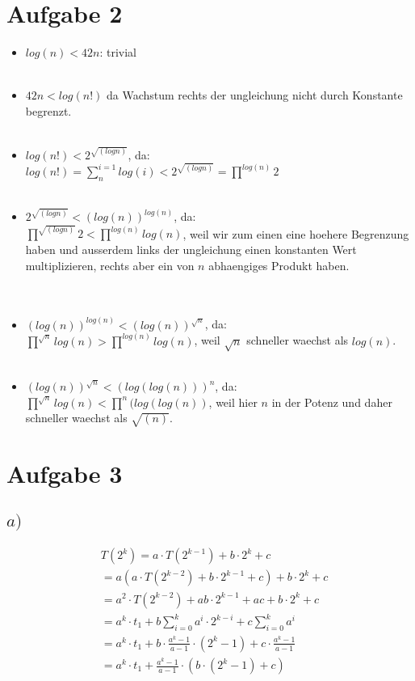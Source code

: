 \documentclass[a4paper]{scrartcl}
\begin{document}
\section*{Aufgabe 2}
\begin{itemize}
	
	\item $log(n) < 42n$: trivial\\
	\\
	\item $42n < log(n!)$ da Wachstum rechts der ungleichung nicht durch Konstante begrenzt.
	\\\\
	\item $log(n!) < 2^{\sqrt{(log n)}}$, da:\\
	$log(n!) = \sum_{n}^{i=1}log(i) <  2^{\sqrt{(log n)}} = \prod^{log(n)} 2$
	\\\\
	\item $2^{\sqrt{(log n)}} < (log(n))^{log(n)}$, da:\\
	$\prod^{\sqrt{(log n)}}2 < \prod^{log(n)}log(n)$, weil wir zum einen eine hoehere Begrenzung haben und ausserdem links der ungleichung einen konstanten Wert multiplizieren, rechts aber ein von $n$ abhaengiges Produkt haben.\\
	\\\\
	\item $(log(n))^{log(n)} < (log(n))^{\sqrt{n}}$, da:\\
	$\prod^{\sqrt{n}} log(n) >  \prod^{log(n)} log(n)$, weil $\sqrt{n}$ schneller waechst als $log(n)$.\\
	\\
	\item $(log(n))^{\sqrt{n}} < (log(log(n)))^n$, da:\\
	$\prod^{\sqrt{n}} log(n) <  \prod^{n} (log(log(n))$, weil hier $n$ in der Potenz und daher schneller waechst als $\sqrt{(n)}$.\
\end{itemize} 


\section*{Aufgabe 3}
\subsection*{$a)$}
\begin{align}
	&T(2^k) = a \cdot T(2^{k-1}) + b \cdot 2^k +c\\
	&= a (a \cdot T(2^{k-2}) + b \cdot 2^{k-1} + c) + b\cdot 2^k +c\\
	&=a^2 \cdot T(2^{k-2}) + ab \cdot 2^{k-1} + ac +b \cdot2^k +c\\
	&=a^k \cdot t_1 + b \sum_{i = 0}^{k} a^i \cdot 2^{k-i} + c\sum_{i=0}^{k}a^i\\
	&=a^k \cdot t_1 + b \cdot \frac{a^k -1}{a-1} \cdot (2^k -1) + c \cdot \frac{a^k -1}{a-1}\\
	&=a^k \cdot t_1 + \frac{a^k -1}{a-1} \cdot (b \cdot (2^k -1) +c)
\end{align}
\end{document}
